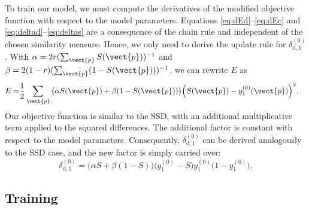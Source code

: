 To train our model, we must compute the derivatives of the modified objective
function with respect to the model parameters. Equations
\ref{eq:dEd}--\ref{eq:dEc} and \ref{eq:deltad}--\ref{eq:deltas} are a
consequence of the chain rule and independent of the chosen similarity measure.
Hence, we only need to derive the update rule for $\delta^{(0)}_{\text{d},1}$.
With $\alpha = 2r (\sum_{\vect{p}}S(\vect{p}))^{-1}$ and $\beta = 2(1 -
r)(\sum_{\vect{p}}(1 - S(\vect{p})))^{-1}$, we can rewrite $E$ as
\begin{align}
E=& \frac{1}{2}\sum_{\vect{p}}\big(\alpha S(\vect{p}) +
\beta(1-S(\vect{p}))\big)\Big(S(\vect{p})-y^{(0)}_1(\vect{p})\Big)^2.
\end{align}
%
Our objective function is similar to the SSD, with an additional multiplicative
term applied to the squared differences. The additional factor is constant with
respect to the model parameters. Consequently, $\delta^{(0)}_{\text{d},1}$ can
be derived analogously to the SSD case, and the new factor is simply carried
over:
\begin{equation} 
\delta^{(0)}_{\text{d},1} = \big(\alpha S + \beta (1 - S)\big)\big(y^{(0)}_1 -
S\big) y^{(0)}_1 \big(1 - y^{(0)}_1\big).
\end{equation}


\subsection{Training}


